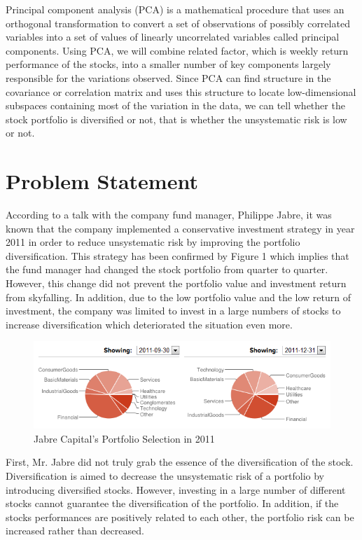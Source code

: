 \documentclass[oneside,12pt]{report}
\begin{document}
Principal component analysis (PCA) is a mathematical procedure that uses an orthogonal transformation to convert a set of observations of possibly correlated variables into a set of values of linearly uncorrelated variables called principal components. Using PCA, we will combine related factor, which is weekly return performance of the stocks, into a smaller number of key components largely responsible for the variations observed. Since PCA can find structure in the covariance or correlation matrix and uses this structure to locate low-dimensional subspaces containing most of the variation in the data, we can tell whether the stock portfolio is diversified or not, that is whether the unsystematic risk is low or not. 


\chapter{Problem Statement}\label{Problem Statement}
According to a talk with the company fund manager, Philippe Jabre, it was known that the company implemented a conservative investment strategy in year 2011 in order to reduce unsystematic risk by improving the portfolio diversification. This strategy has been confirmed by Figure 1 which implies that the fund manager had changed the stock portfolio from quarter to quarter. However, this change did not prevent the portfolio value and investment return from skyfalling. In addition, due to the low portfolio value and the low return of investment, the company was limited to invest in a large numbers of stocks to increase diversification which deteriorated the situation even more. 

\begin{figure}[h]
    \begin{center}
        \includegraphics[width=\textwidth]{2.png}
    \end{center}
    \caption{Jabre Capital's Portfolio Selection in 2011}
    \label{fig:piechart}
\end{figure}

First, Mr. Jabre did not truly grab the essence of the diversification of the stock. Diversification is aimed to decrease the unsystematic risk of a portfolio by introducing diversified stocks. However, investing in a large number of different stocks cannot guarantee the diversification of the portfolio. In addition, if the stocks performances are positively related to each other, the portfolio risk can be increased rather than decreased.
\end{document}
